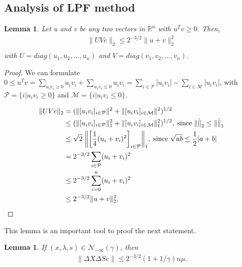 \documentclass[a4paper,10 pt,titlepage,twoside]{book}
\theoremstyle{plain}
\newtheorem{lem}[thm]{Lemma}
\theoremstyle{definition}
\theoremstyle{remark}
\begin{document}
\subsection*{Analysis of LPF method}

\begin{lem}\label{lem1}
	Let u and v be any two vectors in $\mathbb{R}^{n}$ with $u^{T}v \geq 0$. Then, 
\begin{align*}
\lVert UVe \rVert_{2}\leq 2^{-3/2}\lVert u + v \rVert^{2}_{2}\\
\end{align*}
with $U = diag(u_{1}, u_{2}, ..., u_{n})$ and $V = diag(v_{1}, v_{2}, ..., v_{n})$. 
\end{lem}
\begin{proof}
	We can formulate $0 \leq u^{T}v = \sum\limits_{u_{i}v_{i} \geq 0}u_{i}v_{i} + \sum\limits_{u_{i}v_{i} \leq 0}u_{i}v_{i} = \sum\limits_{i \in \mathcal{P}}|u_{i}v_{i}| - \sum\limits_{i \in \mathcal{M}}|u_{i}v_{i}| $, with $\mathcal{P}= \{i | u_{i}v_{i} \geq 0\}$ and $\mathcal{M}= \{i | u_{i}v_{i} \leq 0\}$.

\begin{align*}
\lVert UVe \rVert_{2} &= ( \lVert[u_{i}v_{i}]_{i \in \mathcal{P}} \rVert^{2} +  \lVert[u_{i}v_{i}]_{i \in \mathcal{M}} \rVert^{2})^{1/2}\\
&\leq ( \lVert[u_{i}v_{i}]_{i \in \mathcal{P}} \rVert^{2}_{1} +  \lVert[u_{i}v_{i}]_{i \in \mathcal{M}} \rVert^{2}_{1})^{1/2},\; \text{since\;} \lVert\dot\rVert_{2} \leq \lVert\dot\rVert_{1}\\
&\leq\sqrt{2}\;\bigg\lVert\bigg[\frac{1}{4}(u_{i} + v_{i})^{2}\bigg]_{i\in \mathcal{P}}\bigg\rVert_{1}, \text{\;since\;} \sqrt{ab} \leq \frac{1}{2}|a+b|\\
& = 2^{-3/2} \sum\limits_{i \in \mathcal{P}}(u_{i} + v_{i})^{2}\\
& \leq 2^{-3/2} \sum\limits_{i = 0}^{n}(u_{i} + v_{i})^{2}\\
& \leq 2^{-3/2} \lVert u + v \rVert^{2}_{2}.
\end{align*}
\end{proof}	
This lemma is an important tool to proof the next statement.
\begin{lem}
	If $(x, \lambda, s) \in \mathcal{N}_{-\infty}(\gamma)$, then
	\begin{align*}
	\lVert\Delta X\Delta S e \rVert \leq 2^{-3/2}(1 + 1/ \gamma)n\mu.\\
	\end{align*}
\end{lem}
\end{document}
